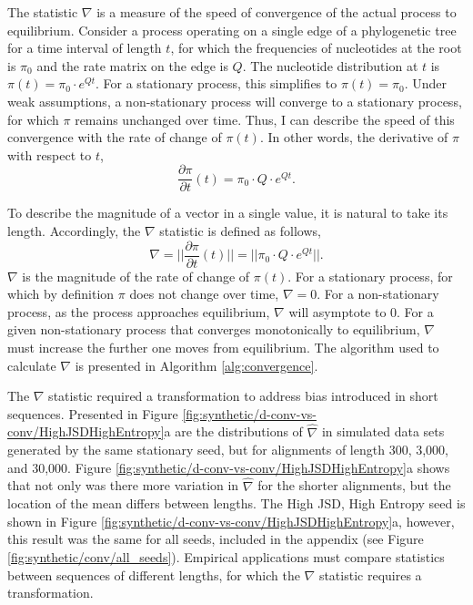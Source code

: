 The statistic $\nabla$ is a measure of the speed of convergence of the actual process to equilibrium. Consider a process operating on a single edge of a phylogenetic tree for a time interval of length $t$, for which the frequencies of nucleotides at the root is $\pi_0$ and the rate matrix on the edge is $Q$. The nucleotide distribution at $t$ is $\pi(t) = \pi_{0} \cdot e^{Qt}$. For a stationary process, this simplifies to $\pi(t) = \pi_{0}$. Under weak assumptions, a non-stationary process will converge to a stationary process, for which $\pi$ remains unchanged over time. Thus, I can describe the speed of this convergence with the rate of change of $\pi(t)$. In other words, the derivative of $\pi$ with respect to $t$,
\begin{equation}
\label{eq:dpi/dt}
\frac{\partial \pi}{\partial t}(t) = \pi_{0} \cdot Q \cdot e^{Qt}.
\end{equation}

To describe the magnitude of a vector in a single value, it is natural to take its length. Accordingly, the $\nabla$ statistic is defined as follows,
\begin{equation}
\label{eq:len-dpi/dt}
\nabla = ||\frac{\partial \pi}{\partial t}(t)|| =|| \pi_{0} \cdot Q \cdot e^{Qt}||.
\end{equation}
$\nabla$ is the magnitude of the rate of change of $\pi(t)$. For a stationary process, for which by definition $\pi$ does not change over time, $\nabla = 0$. For a non-stationary process, as the process approaches equilibrium, $\nabla$ will asymptote to $0$. For a given non-stationary process that converges monotonically to equilibrium, $\nabla$ must increase the further one moves from equilibrium. The algorithm used to calculate $\nabla$ is presented in Algorithm \ref{alg:convergence}.



The $\nabla$ statistic required a transformation to address bias introduced in short sequences. Presented in Figure \ref{fig:synthetic/d-conv-vs-conv/HighJSDHighEntropy}a are the distributions of $\hat \nabla$ in simulated data sets generated by the same stationary seed, but for alignments of length 300, 3,000, and 30,000. Figure \ref{fig:synthetic/d-conv-vs-conv/HighJSDHighEntropy}a shows that not only was there more variation in $\hat \nabla$ for the shorter alignments, but the location of the mean differs between lengths. The High JSD, High Entropy seed is shown in Figure \ref{fig:synthetic/d-conv-vs-conv/HighJSDHighEntropy}a, however, this result was the same for all seeds, included in the appendix (see Figure \ref{fig:synthetic/conv/all_seeds}). Empirical applications must compare statistics between sequences of different lengths, for which the $\nabla$ statistic requires a transformation. 

